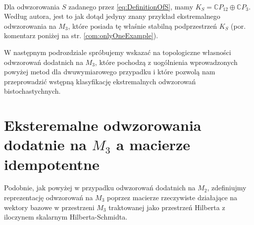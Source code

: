 \paragraph{}

Dla odwzorowania $S$ zadanego przez \eqref{eq:DefinitionOfS}, mamy
$K_{S}= \mathbb{C} P_{12} \oplus \mathbb{C} P_{3}$.
Według autora, jest to jak dotąd jedyny znany przykład ekstremalnego
odwzorowania na $M_{3}$,
które posiada tę właśnie stabilną podprzestrzeń $K_S$
(por. komentarz poniżej na str. \ref{com:onlyOneExample}).

W następnym podrozdziale spróbujemy wskazać na topologiczne własności
odwzorowań dodatnich na $M_3$, które pochodzą z uogólnienia wprowadzonych
powyżej metod dla dwuwymiarowego przypadku
i które pozwolą nam przeprowadzić wstępną klasyfikację ekstremalnych
odwzorowań bistochastychnych.

\section{Eksteremalne odwzorowania dodatnie na $M_{3}$
a macierze idempotentne}

Podobnie, jak powyżej w przypadku odwzorowań dodatnich na $M_{2}$,
zdefiniujmy reprezentację odwzorowań na $M_{3}$ poprzez macierze
rzeczywiste działające na wektory bazowe w przestrzeni $M_{3}$
traktowanej jako przestrzeń Hilberta z iloczynem skalarnym Hilberta-Schmidta.

